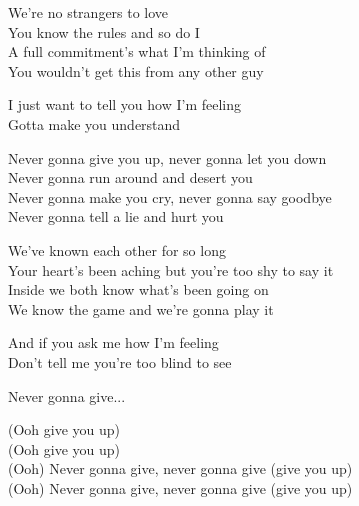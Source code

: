 \vspace{10pt}
We're no strangers to love\\
You know the rules and so do I\\
A full commitment's what I'm thinking of\\
You wouldn't get this from any other guy\par
\vspace{10pt}
I just want to tell you how I'm feeling\\
Gotta make you understand\par
\vspace{10pt}
Never gonna give you up, never gonna let you down\\
Never gonna run around and desert you\\
Never gonna make you cry, never gonna say goodbye\\
Never gonna tell a lie and hurt you\par
\vspace{10pt}
We've known each other for so long\\
Your heart's been aching but you're too shy to say it\\
Inside we both know what's been going on\\
We know the game and we're gonna play it\par
\vspace{10pt}
And if you ask me how I'm feeling \\
Don't tell me you're too blind to see\par
\vspace{10pt}
\revrpt Never gonna give...\rpt\par
\vspace{10pt}
(Ooh give you up)\\
(Ooh give you up)\\
(Ooh) Never gonna give, never gonna give (give you up)\\
(Ooh) Never gonna give, never gonna give (give you up)\par
